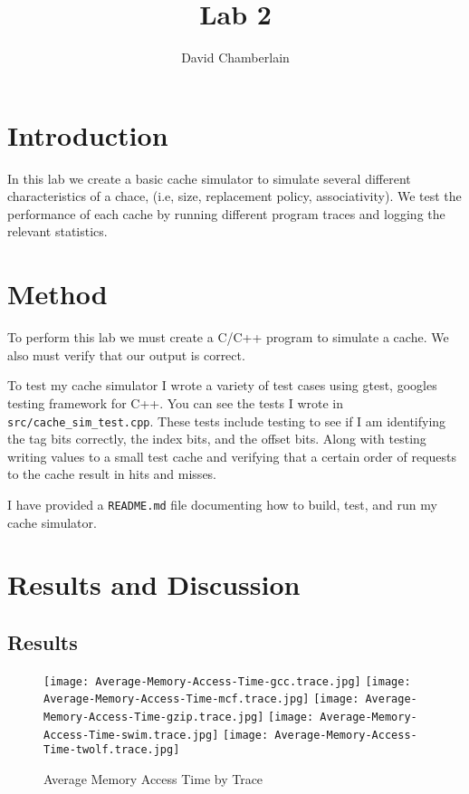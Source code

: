 \documentclass[12pt]{article}
\begin{document}
\title{Lab 2}
\author{David Chamberlain}
\date{}
\maketitle
\section{Introduction}
In this lab we create a basic cache simulator to simulate several different characteristics of a chace, (i.e, size, replacement policy, associativity). We test the performance of each cache by running different program traces and logging the relevant statistics.

\section{Method}
To perform this lab we must create a C/C++ program to simulate a cache. We also must verify that our output is correct.

To test my cache simulator I wrote a variety of test cases using gtest, googles testing framework for C++. You can see the tests I wrote in \verb|src/cache_sim_test.cpp|. These tests include testing to see if I am identifying the tag bits correctly, the index bits, and the  offset bits. Along with testing writing values to a small test cache and verifying that a certain order of requests to the cache result in hits and misses.

I have provided a \verb|README.md| file documenting how to build, test, and run my cache simulator.

\section{Results and Discussion}
\subsection{Results}

\begin{figure}[H]
  \centering
  \texttt{[image: Average-Memory-Access-Time-gcc.trace.jpg]}
  \texttt{[image: Average-Memory-Access-Time-mcf.trace.jpg]}
  \hfil
  \texttt{[image: Average-Memory-Access-Time-gzip.trace.jpg]}
  \texttt{[image: Average-Memory-Access-Time-swim.trace.jpg]}
  \hfil
  \texttt{[image: Average-Memory-Access-Time-twolf.trace.jpg]}
  \caption{Average Memory Access Time by Trace}
\end{figure}
\end{document}
